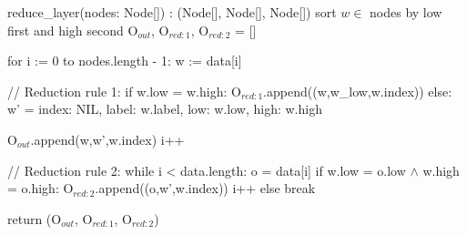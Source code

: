 \begin{blstlisting}
  reduce_layer(nodes: Node[]) : (Node[], Node[], Node[])
      sort $w \in $ nodes by low first and high second
      O$_{\mathit{out}}$, O$_{\mathit{red:}1}$, O$_{\mathit{red:}2}$ = []

      for i := 0 to nodes.length - 1:
          w := data[i]

          // Reduction rule 1:
          if w.low = w.high:
              O$_{\mathit{red:}1}$.append((w,w_low,w.index))
          else:
              w' = {
                index: NIL,
                label: w.label,
                low: w.low,
                high: w.high
              }

              O$_{\mathit{out}}$.append(w,w',w.index)
              i++

              // Reduction rule 2:
              while i < data.length:
                  o = data[i]
                  if w.low = o.low $\land$ w.high = o.high:
                      O$_{\mathit{red:}2}$.append((o,w',w.index))
                      i++
                  else break

      return (O$_{\mathit{out}}$, O$_{\mathit{red:}1}$, O$_{\mathit{red:}2}$)
\end{blstlisting}
